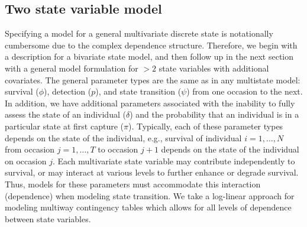 \documentclass[sts]{imsart}
\numberwithin{equation}{section}
\theoremstyle{plain}
\begin{document}
\subsection{Two state variable model}

Specifying a model for a general multivariate discrete state is notationally cumbersome due to the complex dependence structure. Therefore, we begin with a description for a bivariate state model, and then follow up in the next section with a general model formulation for $>2$ state variables with additional covariates. The general parameter types are the same as in any multistate model: survival ($\phi$), detection ($p$), and state transition ($\psi$) from one occasion to the next. In addition, we have additional parameters associated with the inability to fully assess the state of an individual ($\delta$) and the probability that an individual is in a particular state at first capture ($\pi$). Typically, each of these parameter types depends on the state of the individual, e.g., survival of individual $i=1,\dots,N$ from occasion $j=1,\dots,T$ to occasion $j+1$ depends on the state of the individual on occasion $j$. Each multivariate state variable may contribute independently to survival, or may interact at various levels to further enhance or degrade survival. Thus, models for these parameters must accommodate this interaction (dependence) when modeling state transition. We take a log-linear approach \citep{christensen1997log} for modeling multiway contingency tables which allows for all levels of dependence between state variables.     
\end{document}
